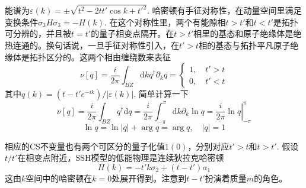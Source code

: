 \documentclass{article}
\numberwithin{equation}{subsection}
\begin{document}
能谱为$\varepsilon(k)=\pm\sqrt{t^2-2tt'\cos k+t'^2}$. 哈密顿有手征对称性，在动量空间里满足变换条件$\sigma_3 H\sigma_3=-H(k)$. 在这个对称性里，两个有能隙相$t>t'$和$t<t'$是拓扑可分辨的，并且被$t=t'$的量子相变点隔开。在$t>t'$相里的基态和原子绝缘体是绝热连通的。换句话说，一旦手征对称性引入，在$t'>t$相的基态与拓扑平凡原子绝缘体是拓扑区分的。这两个相由缠绕数来表征
\begin{equation}
    \nu[q]=\frac{i}{2\pi}\int_{BZ}\mathrm{d}k q^\dagger\partial_k q=\begin{cases}
        1,\quad t'>t\\
        0,\quad t'<t
    \end{cases}
\end{equation}
其中$q(k)=(t-t'e^{-ik})/|\varepsilon(k)|$. 简单计算一下
\begin{equation}
    \nu[q]=\frac{i}{2\pi}\int_{BZ}q^\dagger\mathrm{d}q=\frac{i}{2\pi}\int_{-\pi}^{\pi}\mathrm{d}k\partial_k\ln q=\left.\frac{i}{2\pi}\ln q\right|_{-\pi}^\pi
\end{equation}
\begin{equation}
    \ln q=\ln |q|+\arg q=\arg q,\quad |q|=1
\end{equation}
\begin{center}
\end{center}
相应的CS不变量也有两个可区分的量子化值$1(0)$，分别对应$t'>t$和$t>t'$. 假设$t/t'$在相变点附近，SSH模型的低能物理是连续狄拉克哈密顿
\begin{equation}
    H(k)=-t'k\sigma_2+(t-t')\sigma_1
\end{equation}
这由$k$空间中的哈密顿在$k=0$处展开得到。注意到$t-t'$扮演着质量$m$的角色。
\end{document}
